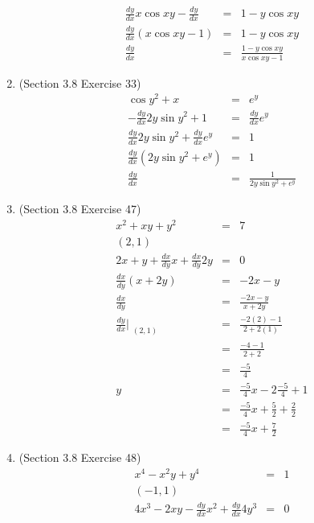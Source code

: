 \documentclass{article}
\begin{document}
\begin{enumerate}
\begin{eqnarray}
            \frac{dy}{dx}x\cos{xy} - \frac{dy}{dx} &=& 1 - y\cos{xy} \\
            \frac{dy}{dx}(x\cos{xy} - 1) &=& 1 - y\cos{xy} \\
            \frac{dy}{dx} &=& \frac{1 - y\cos{xy}}{x\cos{xy} - 1}
        \end{eqnarray}
    \item (Section 3.8 Exercise 33)
        \begin{eqnarray}
            \cos{y^2} + x &=& e^y \\
            -\frac{dy}{dx}2y\sin{y^2} + 1 &=& \frac{dy}{dx}e^y \\
            \frac{dy}{dx}2y\sin{y^2} + \frac{dy}{dx}e^y &=& 1 \\
            \frac{dy}{dx}\left(2y\sin{y^2} + e^y\right) &=& 1 \\
            \frac{dy}{dx} &=& \frac{1}{2y\sin{y^2} + e^y}
        \end{eqnarray}
    \item (Section 3.8 Exercise 47)
        \begin{eqnarray}
            x^2 + xy + y^2 &=& 7 \\
            (2, 1) \\
            2x + y + \frac{dx}{dy}x + \frac{dx}{dy}2y &=& 0 \\
            \frac{dx}{dy}\left(x + 2y\right) &=& - 2x - y \\
            \frac{dx}{dy} &=& \frac{- 2x - y}{x + 2y} \\
            \frac{dy}{dx}\Bigr|_{\substack{(2,1)}} &=& \frac{-2(2) - 1}{2 + 2(1)} \\
                                                   &=& \frac{-4 - 1}{2 + 2} \\
                                                   &=& \frac{-5}{4} \\
            y &=& \frac{-5}{4}x - 2\frac{-5}{4} + 1 \\
              &=& \frac{-5}{4}x + \frac{5}{2} + \frac{2}{2} \\
              &=& \frac{-5}{4}x + \frac{7}{2}
        \end{eqnarray}
    \item (Section 3.8 Exercise 48)
        \begin{eqnarray}
            x^4 - x^2y + y^4 &=& 1 \\
            (-1, 1) \\
            4x^3 - 2xy - \frac{dy}{dx}x^2 + \frac{dy}{dx}4y^3 &=& 0 \\

\end{eqnarray}
\end{enumerate}
\end{document}
